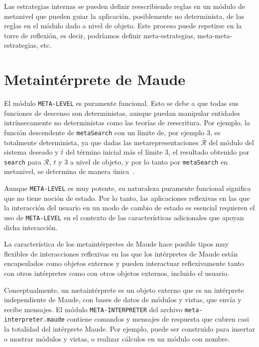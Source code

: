 Las estrategias internas se pueden definir reescribiendo reglas en un módulo de metanivel que pueden guiar la aplicación, posiblemente no determinista, de las reglas en el módulo dado a nivel de objeto. Este proceso puede repetirse en la torre de reflexión, es decir, podríamos definir meta-estrategias, meta-meta-estrategias, etc.



\newpage
\section{Metaintérprete de Maude}\label{MI}

El módulo \texttt{META-LEVEL} es puramente funcional. Esto se debe a que todas sus funciones de descenso son deterministas, aunque puedan manipular entidades intrínsecamente no deterministas como las teorías de reescritura.
%
Por ejemplo, la función descendente de \texttt{metaSearch} con un límite de, por ejemplo 3, es totalmente determinista, ya que dadas las metarepresentaciones $\bar{\mathcal R}$ del módulo del sistema deseado y $\bar{t}$ del término inicial más el límite 3, el resultado obtenido por \texttt{search} para $\mathcal{R}$, $t$ y $3$ a nivel de objeto, y por lo tanto por \texttt{metaSearch} en metanivel, se determina de manera única~\citep{maude30}.
\smallskip

Aunque \texttt{META-LEVEL} es muy potente, su naturaleza puramente funcional significa que no tiene noción de estado. Por lo tanto, las aplicaciones reflexivas en las que la interacción del usuario en un modo de cambio de estado es esencial requieren el uso de \texttt{META-LEVEL} en el contexto de las características adicionales que apoyan dicha interacción.

La característica de los metaintérpretes de Maude hace posible tipos muy flexibles de interacciones reflexivas en las que los intérpretes de Maude están encapsulados como objetos externos y pueden interactuar reflexivamente tanto con otros intérpretes como con otros objetos externos, incluido el usuario.
\medskip


Conceptualmente, un metaintérprete es un objeto externo que es un intérprete independiente de Maude, con bases de datos de módulos y vistas, que envía y recibe mensajes. El módulo \texttt{META-INTERPRETER} del archivo \texttt{meta-interpreter.maude} contiene comandos y mensajes de respuesta que cubren casi la totalidad del intérprete Maude.
Por ejemplo, puede ser construido para insertar o mostrar módulos y vistas, o realizar cálculos en un módulo con nombre.

